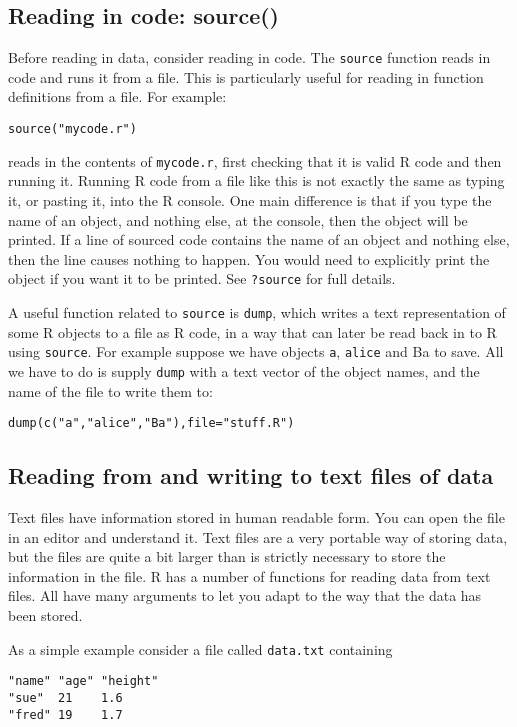 \documentclass[10pt] {article}
\theoremstyle{definition}
\begin{document}
\subsection{Reading in code: source()}
Before reading in data, consider reading in code. The \lstinline+source+ function reads in code and runs it from a file. This is particularly useful for reading in function definitions from a file. For example:
\begin{lstlisting}
source("mycode.r")
\end{lstlisting}
reads in the contents of {\tt mycode.r}, first checking that it is valid R code and then running it. Running R code from a file like this is not exactly the same as typing it, or pasting it, into the R console. One main difference is that if you type the name of an object, and nothing else, at the console, then the object will be printed. If a line of sourced code contains the name of an object and nothing else, then the line causes nothing to happen. You would need to explicitly print the object if you want it to be printed. See {\tt ?source} for full details.

A useful function related to {\tt source} is {\tt dump}, which writes a text representation of some R objects to a file as R code, in a way that can later be read back in to R using {\tt source}. For example suppose we have objects {\tt a}, {\tt alice} and {Ba} to save. All we have to do is supply {\tt dump} with a text vector of the object names, and the name of the file to write them to: 
\begin{lstlisting}
dump(c("a","alice","Ba"),file="stuff.R")
\end{lstlisting}

\subsection{Reading from and writing to text files of data}

Text files have information stored in human readable form. You can open the file in an editor and understand it. Text files are a very portable way of storing data, but the files are quite a bit larger than is strictly necessary to store the information in the file. R has a number of functions for reading data from text files. All have many arguments to let you adapt to the way that the data has been stored. 

As a simple example consider a file called {\tt data.txt} containing 
\begin{verbatim}
"name" "age" "height"
"sue"  21    1.6
"fred" 19    1.7
\end{verbatim}
\end{document}
